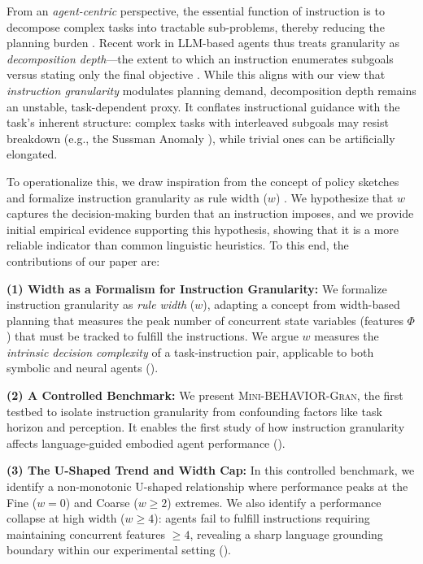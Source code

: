\documentclass[11pt]{article}
\begin{document}
From an \emph{agent-centric} perspective, the essential function of instruction is to decompose complex tasks into tractable sub-problems, thereby reducing the planning burden \citep{DBLP:conf/aips/DrexlerSG22}. 
Recent work in LLM-based agents thus treats granularity as \emph{decomposition depth}---the extent to which an instruction enumerates subgoals versus stating only the final objective \citep{DBLP:conf/wuwnet/Yang0H24,DBLP:conf/corl/MyersZMFL24,DBLP:conf/icml/ShiIEKPVTWWFLDG25,zhong2025survey}. 
While this aligns with our view that \emph{instruction granularity} modulates planning demand, decomposition depth remains an unstable, task-dependent proxy. It conflates instructional guidance with the task's inherent structure: complex tasks with interleaved subgoals may resist breakdown (e.g., the Sussman Anomaly \citep{sussman1975computer}), while trivial ones can be artificially elongated.

To operationalize this, we draw inspiration from the concept of policy sketches \citep{DBLP:journals/jair/DrexlerSG24} and formalize instruction granularity as rule width ($w$) \citep{DBLP:conf/aaai/BonetFG19}. We hypothesize that $w$ captures the decision-making burden that an instruction imposes, and we provide initial empirical evidence supporting this hypothesis, showing that it is a more reliable indicator than common linguistic heuristics. To this end, the contributions of our paper are:

\textbf{(1) Width as a Formalism for Instruction Granularity:} We formalize instruction granularity as \emph{rule width} ($w$), adapting a concept from width-based planning \citep{DBLP:conf/aaai/BonetFG19,DBLP:journals/jair/DrexlerSG24} that measures the peak number of concurrent state variables (features $\Phi$) that must be tracked to fulfill the instructions. We argue $w$ measures the \emph{intrinsic decision complexity} of a task-instruction pair, applicable to both symbolic and neural agents ().

\textbf{(2) A Controlled Benchmark:} We present \textsc{Mini-BEHAVIOR-Gran}, the first testbed to isolate instruction granularity from confounding factors like task horizon and perception. It enables the first study of how instruction granularity affects language-guided embodied agent performance ().

\textbf{(3) The U-Shaped Trend and Width Cap:} In this controlled benchmark, we identify a non-monotonic U-shaped relationship where performance peaks at the Fine ($w=0$) and Coarse ($w \ge 2$) extremes. We also identify a performance collapse at high width ($w \ge 4$): agents fail to fulfill instructions requiring maintaining concurrent features $\ge 4$,  revealing a sharp language grounding boundary within our experimental setting ().
\end{document}

